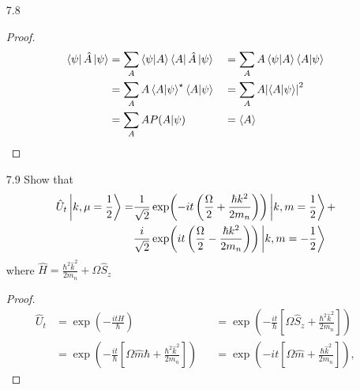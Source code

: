 \begin{enumerate}
  \begin{proof}
    This can be proven quickly with a simple Maclaurin expansion. The Maclaurin expansion of $e^x$ is
    $$e^x = \sum_{n=0}^\infty \frac{x^n}{n!} = 1 + x + \frac{x^2}{2} + \dots,$$
  \end{proof}
  so therefore,
  $$\exp(\frac{-it\hat{H}}{\hbar}) = 1 - \frac{it\hat{H}}{\hbar} + \frac{1}{2} \left( \frac{-it\hat{H}}{\hbar} \right)^2 + \dots$$
  and as $E < \hbar/t$, then $t\hat{H}/h << 1$, so the only two important terms are the first two, meaning that
  \begin{equation*}
    \exp(\frac{-it\hat{H}}{\hbar}) \simeq 1 - \frac{it\hat{H}}{\hbar}
  \end{equation*}
\item[7.8] 
  \begin{proof}
    \begin{align*}
      \bra{\psi} \hat{A} \ket{\psi}
      &= \sum_A \braket{\psi}{A} \bra{A} \hat{A} \ket{\psi} &
      &= \sum_A A \braket{\psi}{A} \braket{A}{\psi} \\
      &= \sum_A A \braket{A}{\psi}^\star \braket{A}{\psi} &
      &= \sum_A A \abs{\braket{A}{\psi}}^2 \\
      &= \sum_A A P(A|\psi) &
      &= \expval{A}
    \end{align*}
  \end{proof}
\item[7.9] Show that
  \begin{align*}
    \hat{U}_t \ket{k, \mu = \frac{1}{2}} =
    &\frac{1}{\sqrt{2}}
    \exp(-it\left( \frac{\Omega}{2} + \frac{\hbar k^2}{2 m_n} \right))
    \ket{k, m=\frac{1}{2}} + \\
    &\frac{i}{\sqrt{2}}
    \exp(it\left( \frac{\Omega}{2} - \frac{\hbar k^2}{2 m_n} \right))
    \ket{k, m=-\frac{1}{2}}
  \end{align*}
  where $\hat{H} = \frac{\hbar^2 \hat{k}^2}{2m_n} + \Omega \hat{S}_z$
  \begin{proof}
    \begin{align*}
      \hat{U}_t
      &= \exp(-\frac{it\hat{H}}{\hbar}) &
      &= \exp(-\frac{it}{\hbar} \left[ \Omega \hat{S}_z + \frac{\hbar^2 \hat{k}^2}{2 m_n} \right] ) \\
      &= \exp(-\frac{it}{\hbar} \left[ \Omega \hat{m} \hbar + \frac{\hbar^2 \hat{k}^2}{2 m_n} \right] ) &
      &= \exp(-it \left[ \Omega \hat{m} + \frac{\hbar \hat{k}^2}{2m_n} \right] ),
    \end{align*}

\end{proof}
\end{enumerate}
